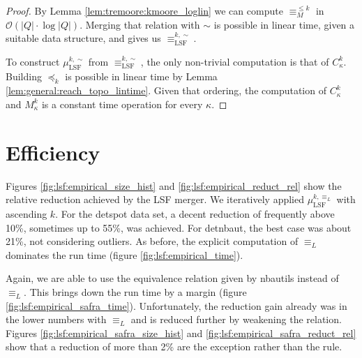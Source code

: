 \begin{proof}
	By Lemma \ref{lem:tremoore:kmoore_loglin} we can compute $\equiv_M^{\leq k}$ in $\mathcal{O}(|Q| \cdot \log |Q|)$. Merging that relation with $\sim$ is possible in linear time, given a suitable data structure, and gives us $\equiv_\text{LSF}^{k,\sim}$.
	
	To construct $\mu_\text{LSF}^{k,\sim}$ from $\equiv_\text{LSF}^{k,\sim}$, the only non-trivial computation is that of $C_\kappa^k$. Building $\preceq_k$ is possible in linear time by Lemma \ref{lem:general:reach_topo_lintime}. Given that ordering, the computation of $C_\kappa^k$ and $M_\kappa^k$ is a constant time operation for every $\kappa$.
\end{proof}


\section{Efficiency}
Figures \ref{fig:lsf:empirical_size_hist} and \ref{fig:lsf:empirical_reduct_rel} show the relative reduction achieved by the LSF merger. We iteratively applied $\mu_\text{LSF}^{k,\equiv_L}$ with ascending $k$. For the \textsf{detspot} data set, a decent reduction of frequently above 10\%, sometimes up to 55\%, was achieved. For \textsf{detnbaut}, the best case was about 21\%, not considering outliers. As before, the explicit computation of $\equiv_L$ dominates the run time (figure \ref{fig:lsf:empirical_time}).

Again, we are able to use the equivalence relation given by nbautils instead of $\equiv_L$. This brings down the run time by a margin (figure \ref{fig:lsf:empirical_safra_time}). Unfortunately, the reduction gain already was in the lower numbers with $\equiv_L$ and is reduced further by weakening the relation. Figures \ref{fig:lsf:empirical_safra_size_hist} and \ref{fig:lsf:empirical_safra_reduct_rel} show that a reduction of more than 2\% are the exception rather than the rule.

